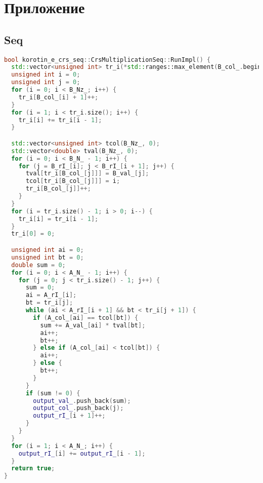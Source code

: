 \documentclass[a4paper,12pt]{article}
\begin{document}
\section{Приложение}
\subsection{Seq}
\begin{lstlisting}[language=C++]
bool korotin_e_crs_seq::CrsMultiplicationSeq::RunImpl() {
  std::vector<unsigned int> tr_i(*std::ranges::max_element(B_col_.begin(), B_col_.end()) + 2, 0);
  unsigned int i = 0;
  unsigned int j = 0;
  for (i = 0; i < B_Nz_; i++) {
    tr_i[B_col_[i] + 1]++;
  }
  for (i = 1; i < tr_i.size(); i++) {
    tr_i[i] += tr_i[i - 1];
  }

  std::vector<unsigned int> tcol(B_Nz_, 0);
  std::vector<double> tval(B_Nz_, 0);
  for (i = 0; i < B_N_ - 1; i++) {
    for (j = B_rI_[i]; j < B_rI_[i + 1]; j++) {
      tval[tr_i[B_col_[j]]] = B_val_[j];
      tcol[tr_i[B_col_[j]]] = i;
      tr_i[B_col_[j]]++;
    }
  }
  for (i = tr_i.size() - 1; i > 0; i--) {
    tr_i[i] = tr_i[i - 1];
  }
  tr_i[0] = 0;

  unsigned int ai = 0;
  unsigned int bt = 0;
  double sum = 0;
  for (i = 0; i < A_N_ - 1; i++) {
    for (j = 0; j < tr_i.size() - 1; j++) {
      sum = 0;
      ai = A_rI_[i];
      bt = tr_i[j];
      while (ai < A_rI_[i + 1] && bt < tr_i[j + 1]) {
        if (A_col_[ai] == tcol[bt]) {
          sum += A_val_[ai] * tval[bt];
          ai++;
          bt++;
        } else if (A_col_[ai] < tcol[bt]) {
          ai++;
        } else {
          bt++;
        }
      }
      if (sum != 0) {
        output_val_.push_back(sum);
        output_col_.push_back(j);
        output_rI_[i + 1]++;
      }
    }
  }
  for (i = 1; i < A_N_; i++) {
    output_rI_[i] += output_rI_[i - 1];
  }
  return true;
}
\end{lstlisting}
\end{document}
